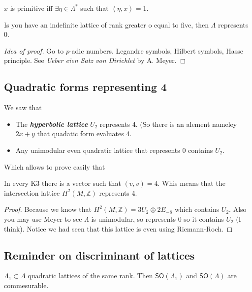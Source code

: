 \begin{remark}\leavevmode
	$x$ is primitive iff $\exists \eta\in\Lambda^*$ such that $\left<\eta,x\right> =1$.
\end{remark}

\begin{thm}[Meyer, 1888]\leavevmode
	Is you have an indefinite lattice of rank greater o equal to five, then $\Lambda$ represents 0.
\end{thm}

\begin{proof}[Idea of proof]\leavevmode
	Go to $p$-adic numbers. Legandre symbols, Hilbert symbols, Hasse principle. See \textit{Ueber eien Satz von Dirichlet} by A. Meyer. 
\end{proof}

\subsection{Quadratic forms representing 4}

We saw that
\begin{itemize}
\item The \textit{\textbf{hyperbolic lattice}}  $U_2$ represents 4. (So there is an alement nameley  $2x+y$ that  quadatic form evaluates 4.
\item Any unimodular even quadratic lattice that represents 0 contains $U_2$.
\end{itemize}
Which allows to prove easily that
\begin{thm}\leavevmode
	In every K3 there is a vector such that $(v,v)=4$. Whis means that the intersection lattice  $H^{2}(M,\mathbb{Z})$ represents 4.
\end{thm}
\begin{proof}\leavevmode
	Because we know that $H^{2}(M,\mathbb{Z})=3U_2\oplus 2E_{-8}$ which contains $U_2$. Also you may use Meyer to see $\Lambda$ is unimodular, so represents 0 so it contains $U_2$ (I think). Notice we had seen that this lattice is even using Riemann-Roch.
\end{proof}

\subsection{Reminder on discriminant of lattices}

\begin{prop}\leavevmode
	$\Lambda_1\subset \Lambda$ quadratic lattices of the same rank. Then $\mathsf{SO}(\Lambda_1)$ and $\mathsf{SO}(\Lambda)$ are commesurable.
\end{prop}

